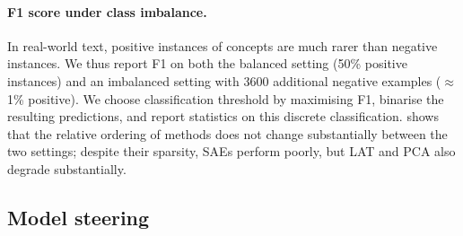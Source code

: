 \documentclass{article}
\theoremstyle{plain}
\theoremstyle{definition}
\theoremstyle{remark}
\newcommand{\methodtag}[2]{%
  \tikz[baseline=(char.base)]{%
    \node[
      fill=#1,
      rounded corners=2pt,
      text=white,
      font=\bfseries,
      minimum width=1em,
      minimum height=1em,
      align=center,
      inner sep=0pt
    ](char){#2};%
  }%
}
\newcommand{\steeringtag}{\protect\methodtag{steeringcolor}{S}}
\begin{document}
\paragraph{F1 score under class imbalance.} In real-world text, positive instances of concepts are much rarer than negative instances.
We thus report F1 on both the balanced setting (50\% positive instances) and an imbalanced setting with 3600 additional negative examples ($\approx$1\% positive).
We choose classification threshold by maximising F1, binarise the resulting predictions, and report statistics on this discrete classification.  shows that the relative ordering of methods does not change substantially between the two settings; despite their sparsity, SAEs perform poorly, but LAT and PCA also degrade substantially.

\subsection{\steeringtag{} Model steering}\label{sec:result-model-steering}
\end{document}
